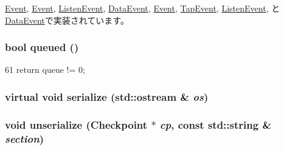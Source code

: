 \hyperlink{classBaseRemoteGDB_1_1Event_aedacbaeee0c89ceca526874c34f6b20b}{Event}, \hyperlink{classGDBListener_1_1Event_aedacbaeee0c89ceca526874c34f6b20b}{Event}, \hyperlink{classVncServer_1_1ListenEvent_aedacbaeee0c89ceca526874c34f6b20b}{ListenEvent}, \hyperlink{classVncServer_1_1DataEvent_aedacbaeee0c89ceca526874c34f6b20b}{DataEvent}, \hyperlink{classTapListener_1_1Event_a2b093972df00400e2325baed216afc46}{Event}, \hyperlink{classTapEvent_a2b093972df00400e2325baed216afc46}{TapEvent}, \hyperlink{classTerminal_1_1ListenEvent_aedacbaeee0c89ceca526874c34f6b20b}{ListenEvent}, と \hyperlink{classTerminal_1_1DataEvent_aedacbaeee0c89ceca526874c34f6b20b}{DataEvent}で実装されています。\hypertarget{classPollEvent_afeaa51bebb848d5f58994a57dcf2a1c6}{
\subsubsection[{queued}]{\setlength{\rightskip}{0pt plus 5cm}bool queued ()}}
\label{classPollEvent_afeaa51bebb848d5f58994a57dcf2a1c6}



\begin{DoxyCode}
61 { return queue != 0; }
\end{DoxyCode}
\hypertarget{classPollEvent_ad6272f80ae37e8331e3969b3f072a801}{
\subsubsection[{serialize}]{\setlength{\rightskip}{0pt plus 5cm}virtual void serialize (std::ostream \& {\em os})}}
\label{classPollEvent_ad6272f80ae37e8331e3969b3f072a801}
\hypertarget{classPollEvent_af22e5d6d660b97db37003ac61ac4ee49}{
\subsubsection[{unserialize}]{\setlength{\rightskip}{0pt plus 5cm}void unserialize ({\bf Checkpoint} $\ast$ {\em cp}, \/  const std::string \& {\em section})}}
\label{classPollEvent_af22e5d6d660b97db37003ac61ac4ee49}



